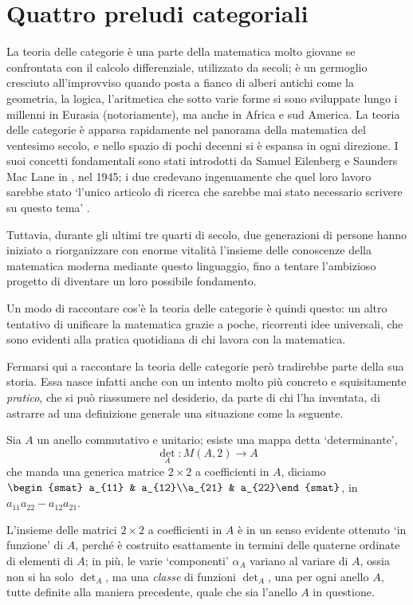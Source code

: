 \chapter{Quattro preludi categoriali}\label{cap_preludi}
La teoria delle categorie è una parte della matematica molto giovane se confrontata con il calcolo differenziale, utilizzato da secoli; è un germoglio cresciuto all'improvviso quando posta a fianco di alberi antichi come la geometria, la logica, l'aritmetica che sotto varie forme si sono sviluppate lungo i millenni in Eurasia (notoriamente), ma anche in Africa \cite{} e sud America. La teoria delle categorie è apparsa rapidamente nel panorama della matematica del ventesimo secolo, e nello spazio di pochi decenni si è espansa in ogni direzione. I suoi concetti fondamentali sono stati introdotti da Samuel Eilenberg e Saunders Mac Lane in \cite{gtone}, nel 1945; i due credevano ingenuamente che quel loro lavoro sarebbe stato `l'unico articolo di ricerca che sarebbe mai stato necessario scrivere su questo tema' \cite{maclane1988concepts}.

Tuttavia, durante gli ultimi tre quarti di secolo, due generazioni di persone %
hanno iniziato a riorganizzare con enorme vitalità l'insieme delle conoscenze della matematica moderna mediante questo linguaggio, fino a tentare l'ambizioso progetto di diventare un loro possibile fondamento.

Un modo di raccontare cos'è la teoria delle categorie è quindi questo: un altro tentativo di unificare la matematica grazie a poche, ricorrenti idee universali, che sono evidenti alla pratica quotidiana di chi lavora con la matematica.
\medskip

Fermarsi qui a raccontare la teoria delle categorie però tradirebbe parte della sua storia. Essa nasce infatti anche con un intento molto più concreto e squisitamente \emph{pratico}, che si può riassumere nel desiderio, da parte di chi l'ha inventata, di astrarre ad una definizione generale una situazione come la seguente.
\begin{example}
	Sia \(A\) un anello commutativo e unitario; esiste una mappa detta `determinante',
	\[\textstyle\det_A : M(A,2) \to A\]
	che manda una generica matrice \(2\times 2\) a coefficienti in \(A\), diciamo \(\begin{smat} a_{11} & a_{12}\\a_{21} & a_{22}\end{smat}\), in \(a_{11}a_{22}-a_{12}a_{21}\).
\end{example}
L'insieme delle matrici \(2\times 2\) a coefficienti in \(A\) è in un senso evidente ottenuto `in funzione' di \(A\), perché è costruito esattamente in termini delle quaterne ordinate di elementi di \(A\); in più, le varie `componenti' \(\alpha_A\) variano al variare di \(A\), ossia non si ha solo \(\det_A\), ma una \emph{classe} di funzioni \(\det_A\), una per ogni anello \(A\), tutte definite alla maniera precedente, quale che sia l'anello \(A\) in questione.

